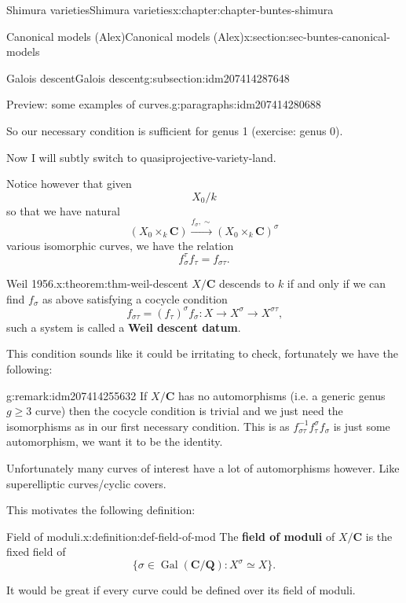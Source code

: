 \documentclass[oneside,10pt,]{book}
\newcommand{\terminology}[1]{\textbf{#1}}
\numberwithin{equation}{section}
\newcommand{\inv}{^{-1}}
\newcommand{\QQ}{\mathbf{Q}}
\newcommand{\CC}{\mathbf{C}}
\newcommand{\Gal}[2]{\operatorname{Gal}(#1/#2)}
\begin{document}
\begin{chapterptx}{Shimura varieties}{}{Shimura varieties}{}{}{x:chapter:chapter-buntes-shimura}
\begin{sectionptx}{Canonical models (Alex)}{}{Canonical models (Alex)}{}{}{x:section:sec-buntes-canonical-models}
\begin{subsectionptx}{Galois descent}{}{Galois descent}{}{}{g:subsection:idm207414287648}
\begin{paragraphs}{Preview: some examples of curves.}{g:paragraphs:idm207414280688}
\par
So our necessary condition is sufficient for genus 1 (exercise: genus 0).%
\end{paragraphs}%
\par
Now I will subtly switch to quasiprojective-variety-land.%
\par
Notice however that given%
\begin{equation*}
X_0/k
\end{equation*}
so that we have natural%
\begin{equation*}
(X_0 \times_k \CC) \xrightarrow{f_\sigma,\sim} (X_0 \times_k \CC)^\sigma
\end{equation*}
various isomorphic curves, we have the relation%
\begin{equation*}
f_\sigma^\tau f_\tau = f_{\sigma\tau}\text{.}
\end{equation*}
%
\begin{theorem}{Weil 1956.}{}{x:theorem:thm-weil-descent}%
\(X/\CC\) descends to \(k\) if and only if we can find \(f_\sigma\) as above satisfying a cocycle condition%
\begin{equation*}
f_{\sigma\tau} = (f_\tau)^\sigma f_\sigma\colon X \to X^\sigma \to X^{\sigma\tau}\text{,}
\end{equation*}
such a system is called a \terminology{Weil descent datum}.%
\end{theorem}
This condition sounds like it could be irritating to check, fortunately we have the following:%
\begin{remark}{}{g:remark:idm207414255632}%
If \(X/\CC\) has no automorphisms (i.e. a generic genus \(g \ge 3\) curve) then the cocycle condition is trivial and we just need the isomorphisms as in our first necessary condition. This is as \(f_{\sigma\tau}\inv f_\tau ^\sigma f_\sigma\) is just some automorphism, we want it to be the identity.%
\par
Unfortunately many curves of interest have a lot of automorphisms however. Like superelliptic curves\slash{}cyclic covers.%
\end{remark}
This motivates the following definition:%
\begin{definition}{Field of moduli.}{x:definition:def-field-of-mod}%
The \terminology{field of moduli} of \(X/\CC\) is the fixed field of%
\begin{equation*}
\{\sigma \in \Gal{\CC}{\QQ} : X^\sigma \simeq X\}\text{.}
\end{equation*}
%
\end{definition}
It would be great if every curve could be defined over its field of moduli.%

\end{subsectionptx}
\end{sectionptx}
\end{chapterptx}
\end{document}
